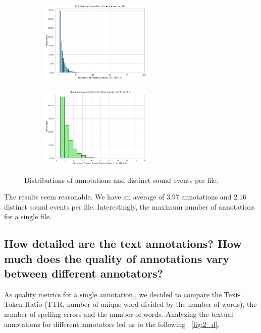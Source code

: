 \begin{figure}[htbp]
  \centering
  \begin{subfigure}[b]{0.49\textwidth}
    \includegraphics[width=\textwidth, height=4cm]{figs/annotation_dist.png}
  \end{subfigure}
  \hfill
  \begin{subfigure}[b]{0.49\textwidth}
    \includegraphics[width=\textwidth, height=4cm]{figs/sound_event_dist.png}
  \end{subfigure}
  \caption{Distributions of annotations and distinct sound events per file.}
  \label{fig:2_c}
\end{figure}

The results seem reasonable. We have an average of 3.97 annotations and 2.16 distinct sound events per file. Interestingly, the maximum number of annotations for a single file.

\subsection{How detailed are the text annotations? How much does the quality of annotations vary between
different annotators?}
\label{sec:Annotation Quality:b2}
As quality metrics for a single annotation,, we decided to compare the Text-Token-Ratio (TTR, number of unique word divided by the number of words), the number of spelling errors and the number of words. Analyzing the textual annotations for different annotators led us to the following ~\ref{fig:2_d}.

